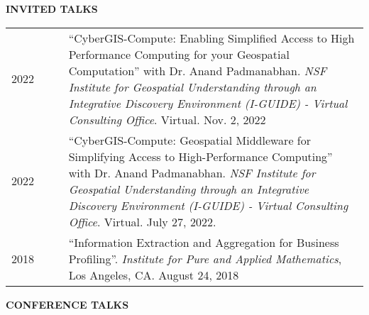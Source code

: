 \documentclass{acmcv}
\begin{document}

    \textbf{\uppercase{Invited Talks}}

    \begin{longtable}{p{0.16\linewidth} p{0.84\linewidth}}
        2022 & ``CyberGIS-Compute: Enabling Simplified Access to High Performance Computing for your Geospatial Computation'' with Dr. Anand Padmanabhan. \textit{NSF Institute for Geospatial Understanding through an Integrative Discovery Environment (I-GUIDE) - Virtual Consulting Office}. Virtual. Nov. 2, 2022\\

        2022 & ``CyberGIS-Compute: Geospatial Middleware for Simplifying Access to High-Performance Computing'' with Dr. Anand Padmanabhan. \textit{NSF Institute for Geospatial Understanding through an Integrative Discovery Environment (I-GUIDE) - Virtual Consulting Office}. Virtual. July 27, 2022. \\

        2018 & ``Information Extraction and Aggregation for Business Profiling''. \textit{Institute for Pure and Applied Mathematics}, Los Angeles, CA. August 24, 2018 \\

    \end{longtable}

	\textbf{\uppercase{Conference Talks}}
\end{document}
